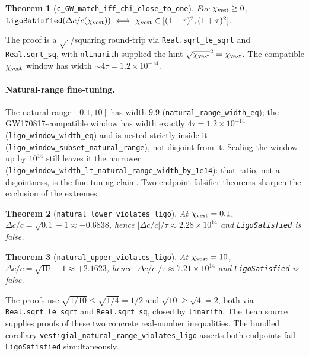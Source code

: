 \documentclass[aps,prl,reprint,nofootinbib,superscriptaddress]{revtex4-2}
\newtheorem{theorem}{Theorem}
\newcommand{\chivest}{\chi_{\rm vest}}
\newcommand{\dccap}{\Delta c/c}
\begin{document}
\begin{theorem}[\texttt{c\_GW\_match\_iff\_chi\_close\_to\_one}]
  \label{thm:bicond}
  For $\chivest \geq 0$,
  $\verb|LigoSatisfied|(\dccap(\chivest))
  \;\Longleftrightarrow\;
  \chivest \in [(1-\tau)^2, (1+\tau)^2]$.
\end{theorem}

The proof is a $\sqrt{\cdot}$/squaring round-trip via
\verb|Real.sqrt_le_sqrt| and \verb|Real.sqrt_sq|, with
\verb|nlinarith| supplied the hint
$\sqrt{\chivest}^2 = \chivest$. The compatible $\chivest$
window has width $\sim 4\tau = 1.2\times 10^{-14}$.

\paragraph{Natural-range fine-tuning.} The natural range $[0.1,10]$
has width $9.9$ (\texttt{natural\_range\_width\_eq}); the
GW170817-compatible window has width exactly $4\tau =
1.2\times 10^{-14}$ (\texttt{ligo\_window\_width\_eq}) and is nested
strictly inside it
(\texttt{ligo\_window\_subset\_natural\_range}), not disjoint from it.
Scaling the window up by $10^{14}$ still leaves it the narrower
(\texttt{ligo\_window\_width\_lt\_natural\_range\_width\_by\_1e14}):
that ratio, not a disjointness, is the fine-tuning claim.
Two endpoint-falsifier theorems sharpen the exclusion of the extremes.

\begin{theorem}[\texttt{natural\_lower\_violates\_ligo}]
  \label{thm:falsifier-lower}
  At $\chivest = 0.1$, $\dccap = \sqrt{0.1} - 1 \approx -0.6838$,
  hence $|\dccap|/\tau \approx 2.28\times 10^{14}$ and
  \verb|LigoSatisfied| is false.
\end{theorem}

\begin{theorem}[\texttt{natural\_upper\_violates\_ligo}]
  \label{thm:falsifier-upper}
  At $\chivest = 10$, $\dccap = \sqrt{10} - 1 \approx +2.1623$,
  hence $|\dccap|/\tau \approx 7.21\times 10^{14}$ and
  \verb|LigoSatisfied| is false.
\end{theorem}

The proofs use $\sqrt{1/10} \leq \sqrt{1/4} = 1/2$ and
$\sqrt{10} \geq \sqrt{4} = 2$, both via \verb|Real.sqrt_le_sqrt|
and \verb|Real.sqrt_sq|, closed by \verb|linarith|. The Lean source
supplies proofs of these two concrete real-number
inequalities. The bundled corollary
\verb|vestigial_natural_range_violates_ligo| asserts both endpoints
fail \verb|LigoSatisfied| simultaneously.
\end{document}

